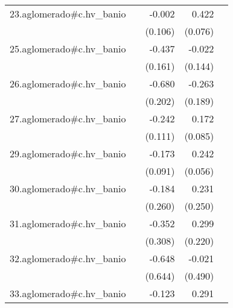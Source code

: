 {\begin{longtable}{l*{4}{D{.}{.}{-1}}}
\addlinespace
23.aglomerado#c.hv\_banio&                     &      -0.002         &       0.422\sym{***}&                     \\
            &                     &     (0.106)         &     (0.076)         &                     \\
\addlinespace
25.aglomerado#c.hv\_banio&                     &      -0.437\sym{**} &      -0.022         &                     \\
            &                     &     (0.161)         &     (0.144)         &                     \\
\addlinespace
26.aglomerado#c.hv\_banio&                     &      -0.680\sym{***}&      -0.263         &                     \\
            &                     &     (0.202)         &     (0.189)         &                     \\
\addlinespace
27.aglomerado#c.hv\_banio&                     &      -0.242\sym{*}  &       0.172\sym{*}  &                     \\
            &                     &     (0.111)         &     (0.085)         &                     \\
\addlinespace
29.aglomerado#c.hv\_banio&                     &      -0.173         &       0.242\sym{***}&                     \\
            &                     &     (0.091)         &     (0.056)         &                     \\
\addlinespace
30.aglomerado#c.hv\_banio&                     &      -0.184         &       0.231         &                     \\
            &                     &     (0.260)         &     (0.250)         &                     \\
\addlinespace
31.aglomerado#c.hv\_banio&                     &      -0.352         &       0.299         &                     \\
            &                     &     (0.308)         &     (0.220)         &                     \\
\addlinespace
32.aglomerado#c.hv\_banio&                     &      -0.648         &      -0.021         &                     \\
            &                     &     (0.644)         &     (0.490)         &                     \\
\addlinespace
33.aglomerado#c.hv\_banio&                     &      -0.123         &       0.291\sym{***}&                     \\

\end{longtable}}
